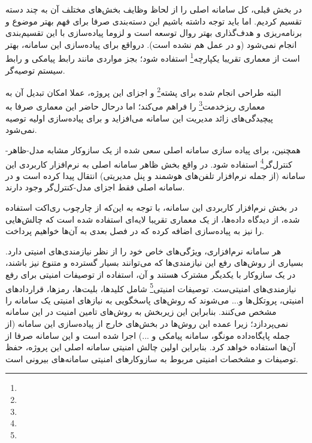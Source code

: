 \newpage


در بخش قبلی، کل سامانه اصلی را از لحاظ وظایف بخش‌های مختلف آن به چند دسته تقسیم کردیم. اما باید توجه داشته باشیم این دسته‌بندی صرفا برای فهم بهتر موضوع و برنامه‌ریزی و هدف‌گذاری بهتر روال توسعه است و لزوما پیاده‌سازی با این تقسیم‌بندی انجام نمی‌شود (و در عمل هم نشده است). درواقع برای پیاده‌سازی این سامانه، بهتر است از معماری تقریبا یکپارچه\footnote{} استفاده شود؛ بجز مواردی مانند رابط پیامکی و رابط سیستم توصیه‌گر. 

البته طراحی انجام شده برای پشته\footnote{} و اجزای این پروژه، عملا امکان تبدیل آن به معماری ریزخدمت\footnote{} را فراهم می‌کند؛ اما درحال حاضر این معماری صرفا به پیچیدگی‌های زائد مدیریت این سامانه می‌افزاید و برای پیاده‌سازی اولیه توصیه نمی‌شود.

همچنین، برای پیاده سازی سامانه اصلی سعی شده از یک سازوکار مشابه مدل-ظاهر-کنترل‌گر\footnote{} استفاده شود. در واقع بخش ظاهر سامانه اصلی به نرم‌افزار کاربردی این سامانه (از جمله نرم‌افزار تلفن‌های هوشمند و پنل مدیریتی) انتقال پیدا کرده است و در سامانه اصلی فقط اجزای مدل-کنترل‌گر وجود دارند.

در بخش نرم‌افزار کاربردی این سامانه، با توجه به این‌که از چارچوب ری‌اکت استفاده شده، از دیدگاه داده‌ها، از یک معماری تقریبا لایه‌ای استفاده شده است که چالش‌هایی را نیز به پیاده‌سازی اضافه کرده که در فصل بعدی به آن‌ها خواهیم پرداخت.

\newpage


هر سامانه نرم‌افزاری، ویژگی‌های خاص خود را از نظر نیازمندی‌های امنیتی دارد. بسیاری از روش‌های رفع این نیازمندی‌ها که می‌توانند بسیار گسترده و متنوع نیز باشند، در یک سازوکار با یکدیگر مشترک هستند و آن، استفاده از توصیفات امنیتی برای رفع نیازمندی‌های امنیتی‌ست. توصیفات امنیتی\footnote{} شامل کلیدها، بلیت‌ها، رمزها،  قراردادهای امنیتی، پروتکل‌ها و... می‌شوند که روش‌های پاسخگویی به نیازهای امنیتی یک سامانه را مشخص می‌کنند. بنابراین این زیربخش به روش‌های تامین امنیت در این سامانه نمی‌پردازد؛ زیرا عمده این روش‌ها در بخش‌های خارج از پیاده‌سازی این سامانه (از جمله پایگاه‌داده مونگو، سامانه پیامکی و ...) اجرا شده است و این سامانه صرفا از آن‌ها استفاده خواهد کرد. بنابراین اولین چالش امنیتی سامانه اصلی این پروژه، حفظ توصیفات و مشخصات امنیتی مربوط به سازوکارهای امنیتی سامانه‌های بیرونی است.

